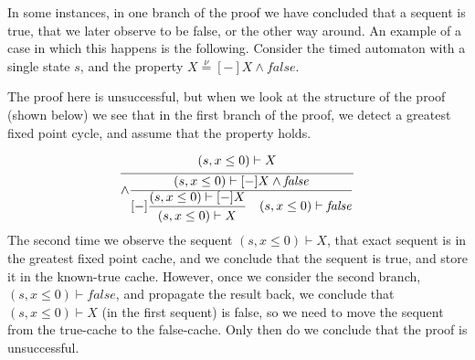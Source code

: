 \documentclass{article}
\newcommand{\proofrule}[3][]{#1 \frac{\raisebox{.7ex}{\normalsize{$#2$}}}
  {\raisebox{-1.0ex}{\normalsize{$#3$}}}}
\newcommand{\loc}{l}
\newcommand{\region}{\mathit{cc}}
\begin{document}
In some instances, in one branch of the proof we have concluded that a sequent is true, that we later observe to be false, or the other way around. An example of a case in which this happens is the following. Consider the timed automaton with a single state $s$, and the property $X \stackrel{\nu}{=} [-]X \land \mathit{false}$.


The proof here is unsuccessful, but when we look at the structure of the proof (shown below) we see that in the first branch of the proof, we detect a greatest fixed point cycle, and assume that the property holds.

\[
\proofrule
{(s,x \leq 0) \vdash X}
{
  \proofrule[\land]
  {(s,x \leq 0) \vdash [-]X \land \mathit{false}}
  {
    \proofrule[{[-]}]
    {(s,x \leq 0) \vdash [-]X}
    {
      (s,x \leq 0) \vdash X
    }
    \quad
    (s,x \leq 0) \vdash \mathit{false}
  }
}
\]
The second time we observe the sequent $(s, x \leq 0) \vdash X$, that exact sequent is in the greatest fixed point cache, and we conclude that the sequent is true, and store it in the known-true cache. However, once we consider the second branch, $(s, x \leq 0) \vdash \mathit{false}$, and propagate the result back, we conclude that $(s, x \leq 0) \vdash X$ (in the first sequent) is false, so we need to move the sequent from the true-cache to the false-cache. Only then do we conclude that the proof is unsuccessful.




\end{document}
